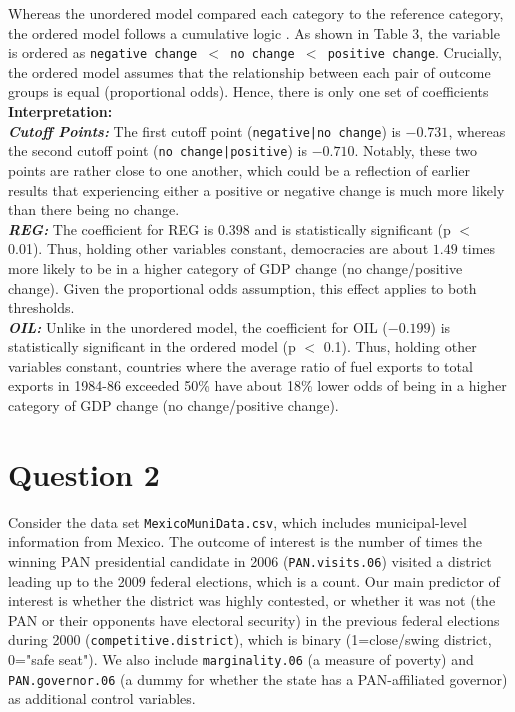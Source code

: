 \documentclass[12pt,letterpaper]{article}
\begin{document}
\noindent Whereas the unordered model compared each category to the reference category, the ordered model follows a cumulative logic . As shown in Table 3, the variable is ordered as \texttt{negative change $<$ no change $<$ positive change}. Crucially, the ordered model assumes that the relationship between each pair of outcome groups is equal (proportional odds). Hence, there is only one set of coefficients\\
\noindent \textbf{Interpretation:}\\
\noindent\textit{\textbf{Cutoff Points:}}
\noindent The first cutoff point (\texttt{negative|no change}) is $-0.731$, whereas the second cutoff point (\texttt{no change|positive}) is $-0.710$. Notably, these two points are rather close to one another, which could be a reflection of earlier results that experiencing either a positive or negative change is much more likely than there being no change.\\
\noindent\textit{\textbf{REG:}}
\noindent The coefficient for REG is $0.398$ and is statistically significant (p $<$ 0.01). Thus, holding other variables constant, democracies are about $1.49$ times more likely to be in a higher category of GDP change (no change/positive change). Given the proportional odds assumption, this effect applies to both thresholds.\\
\noindent\textit{\textbf{OIL:}}
\noindent Unlike in the unordered model, the coefficient for OIL ($-0.199$) is statistically significant in the ordered model (p $<$ 0.1). Thus, holding other variables constant, countries where the average ratio of fuel exports to total exports in 1984-86 exceeded 50\% have about 18\% lower odds of being in a higher category of GDP change (no change/positive change).

\section*{Question 2} 
\vspace{.25cm}

\noindent Consider the data set \texttt{MexicoMuniData.csv}, which includes municipal-level information from Mexico. The outcome of interest is the number of times the winning PAN presidential candidate in 2006 (\texttt{PAN.visits.06}) visited a district leading up to the 2009 federal elections, which is a count. Our main predictor of interest is whether the district was highly contested, or whether it was not (the PAN or their opponents have electoral security) in the previous federal elections during 2000 (\texttt{competitive.district}), which is binary (1=close/swing district, 0="safe seat"). We also include \texttt{marginality.06} (a measure of poverty) and \texttt{PAN.governor.06} (a dummy for whether the state has a PAN-affiliated governor) as additional control variables. 
\end{document}
